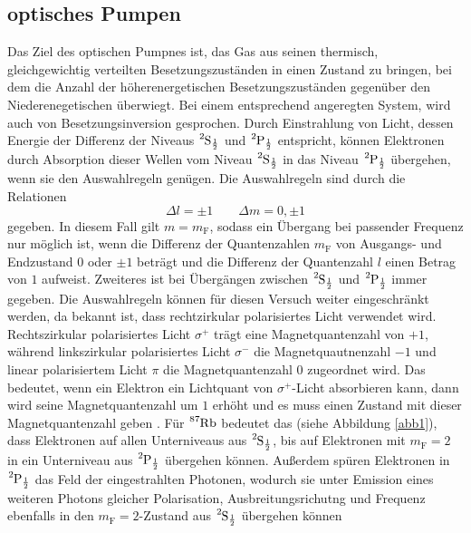 \subsection{optisches Pumpen}

Das Ziel des optischen Pumpnes ist, das Gas aus seinen thermisch, gleichgewichtig
verteilten
Besetzungszuständen in einen Zustand zu bringen, bei dem die Anzahl der höherenergetischen 
Besetzungszuständen gegenüber den Niederenegetischen überwiegt. Bei einem 
entsprechend angeregten System, wird auch von Besetzungsinversion gesprochen.
Durch Einstrahlung von Licht, dessen Energie der Differenz der Niveaus 
$\ce{^{2}S_{\frac{1}{2}}}$ und $\ce{^{2}P_{\frac{1}{2}}}$ entspricht,
können Elektronen durch Absorption dieser Wellen vom Niveau 
$\ce{^{2}S_{\frac{1}{2}}}$ in das Niveau $\ce{^{2}P_{\frac{1}{2}}}$ übergehen,
wenn sie den Auswahlregeln genügen.
Die Auswahlregeln sind durch die Relationen
\begin{equation}
    \Delta l = \pm 1 \qquad \Delta m = 0, \pm1
\end{equation}
gegeben. In diesem Fall gilt $m = m_{\text{F}}$, sodass ein Übergang bei passender 
Frequenz nur möglich ist, wenn die Differenz der Quantenzahlen $m_{\text{F}}$ 
von Ausgangs- und Endzustand $0$ oder $\pm 1$ beträgt und die Differenz der 
Quantenzahl $l$ einen Betrag von $1$ aufweist. Zweiteres ist bei Übergängen zwischen 
$\ce{^{2}S_{\frac{1}{2}}}$ und $\ce{^{2}P_{\frac{1}{2}}}$ immer gegeben.
Die Auswahlregeln können für diesen Versuch weiter eingeschränkt werden, da bekannt ist,
dass rechtzirkular polarisiertes Licht verwendet wird. 
Rechtszirkular polarisiertes Licht $\sigma^+$ trägt eine Magnetquantenzahl von 
$+1$, während linkszirkular polarisiertes Licht $\sigma^-$ die Magnetquautnenzahl 
$-1$ und linear polarisiertem Licht $\pi$ die Magnetquantenzahl $0$ zugeordnet wird.
Das bedeutet, wenn ein Elektron ein Lichtquant von $\sigma^+$-Licht absorbieren kann, 
dann wird seine Magnetquantenzahl um $1$ erhöht und es muss einen Zustand mit 
dieser Magnetquantenzahl geben \cite{1}. 
Für $\ce{^87Rb}$ bedeutet das (siehe Abbildung \ref{abb1}), dass Elektronen auf allen 
Unterniveaus aus $\ce{^{2}S_{\frac{1}{2}}}$, bis auf Elektronen mit $m_{\text{F}} = 2$
in ein Unterniveau aus $\ce{^{2}P_{\frac{1}{2}}}$ übergehen können.
Außerdem spüren Elektronen in $\ce{^{2}P_{\frac{1}{2}}}$ das Feld der 
eingestrahlten Photonen, wodurch sie unter Emission eines weiteren Photons gleicher 
Polarisation, Ausbreitungsrichutng und Frequenz ebenfalls in den 
$m_{\text{F}} = 2$-Zustand aus $\ce{^{2}S_{\frac{1}{2}}}$ übergehen können
